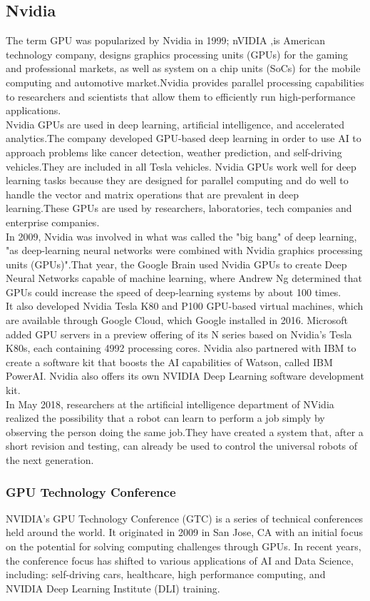 \subsection{Nvidia}
The term GPU was popularized by Nvidia in 1999; nVIDIA ,is American technology company, designs graphics processing units (GPUs) for the gaming and professional markets, as well as system on a chip units (SoCs) for the mobile computing and automotive market.Nvidia provides parallel processing capabilities to researchers and scientists that allow them to efficiently run high-performance applications.\cite{web009} \\
Nvidia GPUs are used in deep learning, artificial intelligence, and accelerated analytics.The company developed GPU-based deep learning in order to use AI to approach problems like cancer detection, weather prediction, and self-driving vehicles.They are included in all Tesla vehicles. Nvidia GPUs work well for deep learning tasks because they are designed for parallel computing and do well to handle the vector and matrix operations that are prevalent in deep learning.These GPUs are used by researchers, laboratories, tech companies and enterprise companies.\\
In 2009, Nvidia was involved in what was called the "big bang" of deep learning, "as deep-learning neural networks were combined with Nvidia graphics processing units (GPUs)".That year, the Google Brain used Nvidia GPUs to create Deep Neural Networks capable of machine learning, where Andrew Ng determined that GPUs could increase the speed of deep-learning systems by about 100 times.\\
It also developed Nvidia Tesla K80 and P100 GPU-based virtual machines, which are available through Google Cloud, which Google installed in 2016. Microsoft added GPU servers in a preview offering of its N series based on Nvidia's Tesla K80s, each containing 4992 processing cores. Nvidia also partnered with IBM to create a software kit that boosts the AI capabilities of Watson, called IBM PowerAI. Nvidia also offers its own NVIDIA Deep Learning software development kit.\\ In May 2018, researchers at the artificial intelligence department of NVidia realized the possibility that a robot can learn to perform a job simply by observing the person doing the same job.They have created a system that, after a short revision and testing, can already be used to control the universal robots of the next generation.
\subsubsection{GPU Technology Conference}
NVIDIA’s GPU Technology Conference (GTC) is a series of technical conferences held around the world. It originated in 2009 in San Jose, CA with an initial focus on the potential for solving computing challenges through GPUs. In recent years, the conference focus has shifted to various applications of AI and Data Science, including: self-driving cars, healthcare, high performance computing, and NVIDIA Deep Learning Institute (DLI) training.
